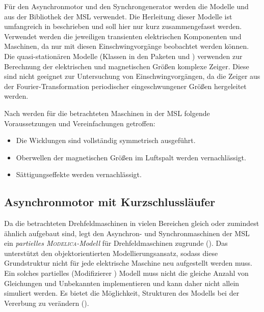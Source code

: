 Für den Asynchronmotor und den Synchrongenerator werden die Modelle  und  aus der Bibliothek  der MSL verwendet. Die Herleitung dieser Modelle ist umfangreich in \cite[]{kralModelicaObjektorientierteModellbildung2019} beschrieben und soll hier nur kurz zusammengefasst werden. Verwendet werden die jeweiligen transienten elektrischen Komponenten und Maschinen, da nur mit diesen Einschwingvorgänge beobachtet werden können. Die quasi-stationären Modelle (Klassen in den Paketen  und ) verwenden zur Berechnung der elektrischen und magnetischen Größen komplexe Zeiger. Diese sind nicht geeignet zur Untersuchung von Einschwingvorgängen, da die Zeiger aus der Fourier-Transformation periodischer eingeschwungener Größen hergeleitet werden.

Nach \cite[S. 149]{kralModelicaObjektorientierteModellbildung2019} werden für die betrachteten Maschinen in der MSL folgende Voraussetzungen und Vereinfachungen getroffen:
\begin{itemize}
	\item Die Wicklungen sind vollständig symmetrisch ausgeführt.
	\item Oberwellen der magnetischen Größen im Luftspalt werden vernachlässigt.
	\item Sättigungseffekte werden vernachlässigt.
\end{itemize}

\subsection{Asynchronmotor mit Kurzschlussläufer}\label{sec:asynchronmotor-mit-kurzschlussluxe4ufer}
Da die betrachteten Drehfeldmaschinen in vielen Bereichen gleich oder zumindest ähnlich aufgebaut sind, legt \cite{kralModelicaObjektorientierteModellbildung2019} den Asynchron- und Synchronmaschinen der MSL ein \emph{partielles \textsc{Modelica}-Modell} für Drehfeldmaschinen zugrunde (). Das unterstützt den objektorientierten Modellierungsansatz, sodass diese Grundstruktur nicht für jede elektrische Maschine neu aufgestellt werden muss. Ein solches partielles (Modifizierer ) Modell muss nicht die gleiche Anzahl von Gleichungen und Unbekannten implementieren und kann daher nicht allein simuliert werden. Es bietet die Möglichkeit, Strukturen des Modells bei der Vererbung zu verändern ().

